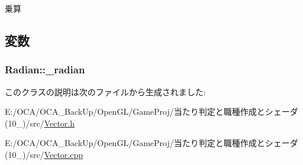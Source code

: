 乗算 



\subsection{変数}
\hypertarget{class_radian_ab3bdb824656f3310b4cc449dfccbccdc}{
\subsubsection[{\-\_\-radian}]{ Radian\-::\-\_\-radian}}\label{class_radian_ab3bdb824656f3310b4cc449dfccbccdc}


このクラスの説明は次のファイルから生成されました\-:\begin{DoxyCompactItemize}
\item 
E\-:/\-O\-C\-A/\-O\-C\-A\-\_\-\-Back\-Up/\-Open\-G\-L/\-Game\-Proj/当たり判定と職種作成とシェーダ(10\-\_)/src/\hyperlink{_vector_8h}{Vector.\-h}\item 
E\-:/\-O\-C\-A/\-O\-C\-A\-\_\-\-Back\-Up/\-Open\-G\-L/\-Game\-Proj/当たり判定と職種作成とシェーダ(10\-\_)/src/\hyperlink{_vector_8cpp}{Vector.\-cpp}\end{DoxyCompactItemize}
